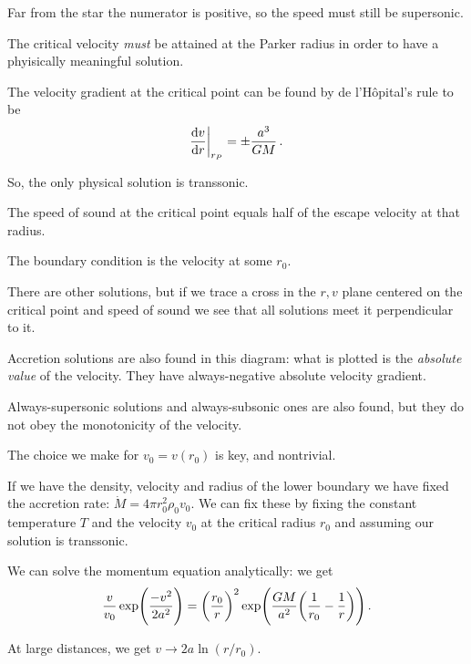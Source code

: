 \documentclass[main.tex]{subfiles}
\begin{document}
Far from the star the numerator is positive, so the speed must still be supersonic.

The critical velocity \emph{must} be attained at the Parker radius in order to have a phyisically meaningful solution.

The velocity gradient at the critical point can be found by de l'Hôpital's rule to be 
%
\begin{equation}
  \dv{v}{r} \bigg|_{r_P} = \pm \frac{a^3}{GM}
\,.
\end{equation}

So, the only physical solution is transsonic.

\begin{claim}[Exercise]
The speed of sound at the critical point equals half of the escape velocity at that radius.
\end{claim}

The boundary condition is the velocity at some \(r_0 \).

There are other solutions, but if we trace a cross in the \(r, v\) plane centered on the critical point and speed of sound we see that all solutions meet it perpendicular to it.

Accretion solutions are also found in this diagram: what is plotted is the \emph{absolute value} of the velocity. They have always-negative absolute velocity gradient.

Always-supersonic solutions and always-subsonic ones are also found, but they do not obey the monotonicity of the velocity.

The choice we make for \(v_0  = v(r_0)\) is key, and nontrivial.

If we have the density, velocity and radius of the lower boundary we have fixed the accretion rate: \(\dot{M}  = 4 \pi r_0^2 \rho_0 v_0 \).
We can fix these by fixing the constant temperature \(T\) and the velocity \(v_0 \) at the critical radius \(r_0\) and assuming our solution is transsonic.


We can solve the momentum equation analytically: we get 
%
\begin{equation}
  \frac{v}{v_0 } \exp( \frac{-v^2}{2 a^2}) = \qty(\frac{r_0}{r})^2 \exp(\frac{GM}{a^2} \qty(\frac{1}{r_0 } - \frac{1}{r}))  
\,.
\end{equation}
%

At large distances, we get \(v \rightarrow 2 a \ln(r/r_0)\).
\end{document}
